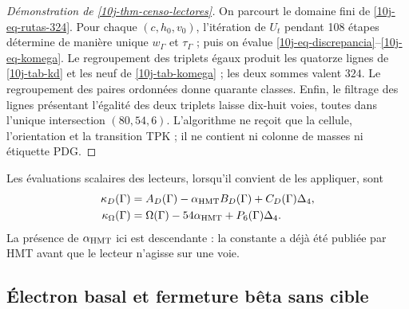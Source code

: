 \begin{proof}[Démonstration de \cref{10j-thm-censo-lectores}]
On parcourt le domaine fini de \eqref{10j-eq-rutas-324}. Pour chaque \((c,h_0,v_0)\), l'itération de \(U_t\) pendant 108 étapes détermine de manière unique \(w_\Gamma\) et \(\tau_\Gamma\) ; puis on évalue \eqref{10j-eq-discrepancia}--\eqref{10j-eq-komega}. Le regroupement des triplets égaux produit les quatorze lignes de \cref{10j-tab-kd} et les neuf de \cref{10j-tab-komega} ; les deux sommes valent \(324\). Le regroupement des paires ordonnées donne quarante classes. Enfin, le filtrage des lignes présentant l'égalité des deux triplets laisse dix-huit voies, toutes dans l'unique intersection \((80,54,6)\). L'algorithme ne reçoit que la cellule, l'orientation et la transition TPK ; il ne contient ni colonne de masses ni étiquette PDG.
\end{proof}

Les évaluations scalaires des lecteurs, lorsqu'il convient de les appliquer, sont
\begin{align}
 \kappa_D(\Gamma)
 &=A_D(\Gamma)-\alpha_{\rm HMT}B_D(\Gamma)
   +C_D(\Gamma)\Delta_4,
 \label{10j-eq-kappa-d}\\
 \kappa_\Omega(\Gamma)
 &=\Omega(\Gamma)-54\alpha_{\rm HMT}
   +P_6(\Gamma)\Delta_4.
 \label{10j-eq-kappa-omega}
\end{align}
La présence de \(\alpha_{\rm HMT}\) ici est descendante : la constante a déjà été publiée par HMT avant que le lecteur n'agisse sur une voie.

\subsection{Électron basal et fermeture bêta sans cible}

